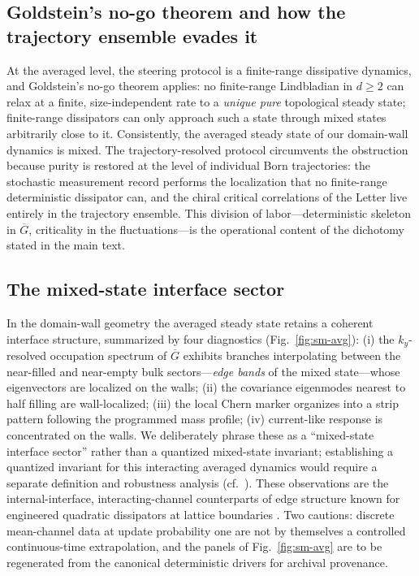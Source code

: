 \documentclass[aps,prl,onecolumn,superscriptaddress,nofootinbib]{revtex4-2}
\newcommand{\Gbar}{\overline{G}}
\begin{document}
\subsection{Goldstein's no-go theorem and how the trajectory ensemble evades it}

At the averaged level, the steering protocol is a finite-range dissipative dynamics, and Goldstein's no-go theorem \cite{Goldstein2019} applies: no finite-range Lindbladian in $d\geq2$ can relax at a finite, size-independent rate to a \emph{unique pure} topological steady state; finite-range dissipators can only approach such a state through mixed states arbitrarily close to it.  Consistently, the averaged steady state of our domain-wall dynamics is mixed.  The trajectory-resolved protocol circumvents the obstruction because purity is restored at the level of individual Born trajectories: the stochastic measurement record performs the localization that no finite-range deterministic dissipator can, and the chiral critical correlations of the Letter live entirely in the trajectory ensemble.  This division of labor---deterministic skeleton in $\Gbar$, criticality in the fluctuations---is the operational content of the dichotomy stated in the main text.

\subsection{The mixed-state interface sector}
\label{sm:avg-interface}

In the domain-wall geometry the averaged steady state retains a coherent interface structure, summarized by four diagnostics (Fig.~\ref{fig:sm-avg}):
(i) the $k_y$-resolved occupation spectrum of $\Gbar$ exhibits branches interpolating between the near-filled and near-empty bulk sectors---\emph{edge bands} of the mixed state---whose eigenvectors are localized on the walls;
(ii) the covariance eigenmodes nearest to half filling are wall-localized;
(iii) the local Chern marker organizes into a strip pattern following the programmed mass profile;
(iv) current-like response is concentrated on the walls.
We deliberately phrase these as a ``mixed-state interface sector'' rather than a quantized mixed-state invariant; establishing a quantized invariant for this interacting averaged dynamics would require a separate definition and robustness analysis (cf.\ \cite{BudichDiehl2015,Bardyn2018,WawerFleischhauer2021}).  These observations are the internal-interface, interacting-channel counterparts of edge structure known for engineered quadratic dissipators at lattice boundaries \cite{Diehl2011,Bardyn2013,BudichZollerDiehl2015,YangMoligniniBergholtz2023,HegdeEhmckeMeng2023,ShavitGoldstein2020}.  Two cautions: discrete mean-channel data at update probability one are not by themselves a controlled continuous-time extrapolation, and the panels of Fig.~\ref{fig:sm-avg} are to be regenerated from the canonical deterministic drivers for archival provenance.
\end{document}
